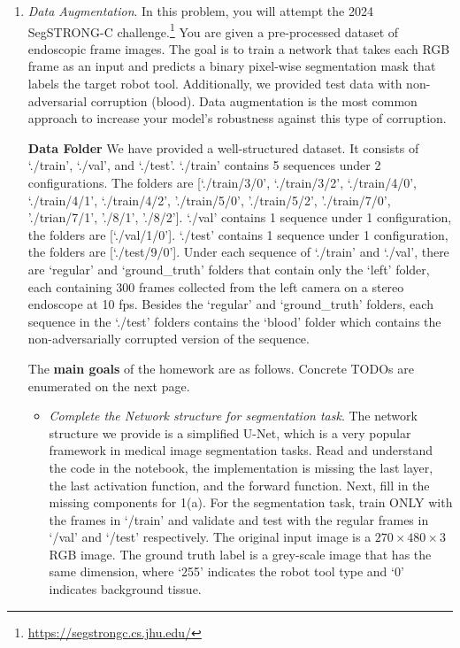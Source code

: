 \documentclass[a4paper]{article}
\begin{document}
	\begin{enumerate}
		\item \textit{Data Augmentation}. In this problem, you will attempt the 2024 SegSTRONG-C challenge.\footnote{\url{https://segstrongc.cs.jhu.edu/}} You are given a pre-processed dataset of endoscopic frame images. The goal is to train a network that takes each RGB frame as an input and predicts a binary pixel-wise segmentation mask that labels the target robot tool. Additionally, we provided test data with non-adversarial corruption (blood). Data augmentation is the most common approach to increase your model's robustness against this type of corruption.
		
		\textbf{Data Folder} 
		We have provided a well-structured dataset. It consists of `./train', `./val', and `./test'.  `./train' contains 5 sequences under 2 configurations. The folders are [`./train/3/0', `./train/3/2', `./train/4/0', `./train/4/1', `./train/4/2', './train/5/0', './train/5/2', './train/7/0', './trian/7/1', './8/1', './8/2']. `./val' contains 1 sequence under 1 configuration, the folders are [`./val/1/0']. `./test' contains 1 sequence under 1 configuration, the folders are [`./test/9/0']. Under each sequence of `./train' and `./val', there are `regular' and `ground\_truth' folders that contain only the `left' folder, each containing 300 frames collected from the left camera on a stereo endoscope at 10 fps. Besides the `regular' and `ground\_truth' folders, each sequence in the `./test' folders contains the `blood' folder which contains the non-adversarially corrupted version of the sequence.
		
		The \textbf{main goals} of the homework are as follows. Concrete TODOs are enumerated on the next page.
		
		\begin{itemize}
			\item \textit{Complete the Network structure for segmentation task}. The network structure we provide is a simplified U-Net, which is a very popular framework in medical image segmentation tasks.  Read and understand the code in the notebook, the implementation is missing the last layer, the last activation function, and the forward function. Next, fill in the missing components for 1(a). For the segmentation task, train ONLY with the frames in `/train' and validate and test with the regular frames in `/val' and `/test' respectively. The original input image is a $270 \times 480 \times 3$ RGB image. The ground truth label is a grey-scale image that has the same dimension, where `255' indicates the robot tool type and `0' indicates background tissue. 


\end{itemize}
\end{enumerate}
\end{document}
